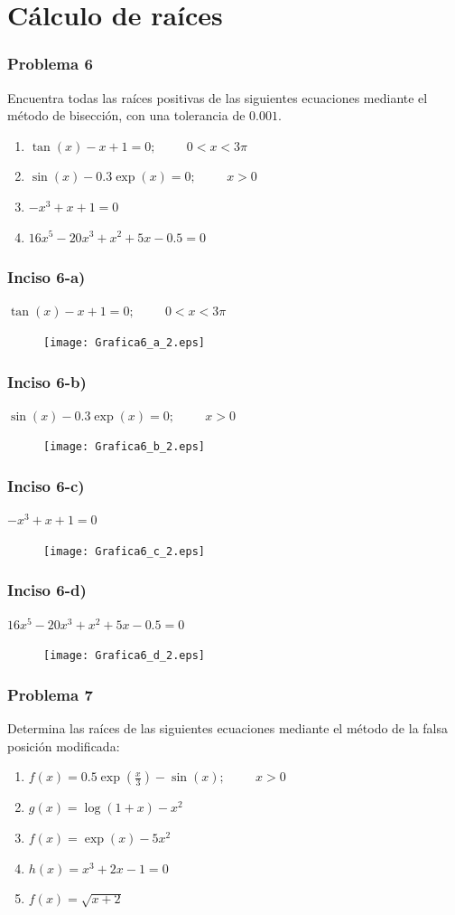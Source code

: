 \section{Cálculo de raíces}
\begin{frame}
\frametitle{Problema 6}
Encuentra todas las raíces positivas de las siguientes ecuaciones mediante el método de bisección, con una tolerancia de $0.001$.
\begin{enumerate}\label{grupo1}
\renewcommand{\arraystretch}{1.5}
\item $\tan(x) - x + 1 = 0; \hspace{1cm} 0 < x < 3\pi$
\item $\sin(x) - 0.3 \exp(x) = 0; \hspace{1cm} x > 0$
\item $-x^{3} + x + 1 = 0$
\item $16x^{5} - 20x^{3} + x^{2} + 5x - 0.5 = 0$
\end{enumerate}
\end{frame}
\begin{frame}
\frametitle{Inciso 6-a)}
$\tan(x) - x + 1 = 0; \hspace{1cm} 0 < x < 3\pi$
\begin{figure}
	\centering
	\texttt{[image: Grafica6\_a\_2.eps]}
\end{figure}
\end{frame}
\begin{frame}
\frametitle{Inciso 6-b)}
$\sin(x) - 0.3 \exp(x) = 0; \hspace{1cm} x > 0$
\begin{figure}
	\centering
	\texttt{[image: Grafica6\_b\_2.eps]}
\end{figure}
\end{frame}
\begin{frame}
\frametitle{Inciso 6-c)}
$-x^{3} + x + 1 = 0$
\begin{figure}
	\centering
	\texttt{[image: Grafica6\_c\_2.eps]}
\end{figure}
\end{frame}
\begin{frame}
\frametitle{Inciso 6-d)}
$16x^{5} - 20x^{3} + x^{2} + 5x - 0.5 = 0$
\begin{figure}
	\centering
	\texttt{[image: Grafica6\_d\_2.eps]}
\end{figure}
\end{frame}
\begin{frame}
\frametitle{Problema 7}
Determina las raíces de las siguientes ecuaciones mediante el método de la falsa posición modificada:
	\begin{enumerate}
		\renewcommand{\arraystretch}{1.5}
		\item $f(x) = 0.5\exp(\frac{x}{3})- \sin(x); \hspace{1cm} x > 0$
		\item $g(x) = \log(1 + x) - x^{2}$
		\item $f(x) = \exp(x) - 5x^{2}$
		\item $h(x) = x^{3} + 2x - 1 = 0$
		\item $f(x) = \sqrt{x+2}$
	\end{enumerate}
\end{frame}
